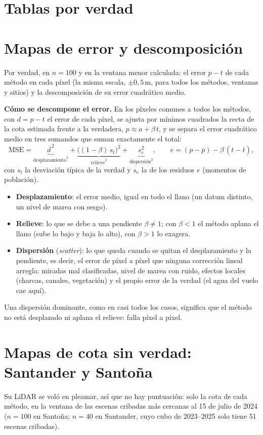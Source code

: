 \documentclass[10pt,a4paper]{article}
\begin{document}
\clearpage
\section*{Tablas por verdad}


\section*{Mapas de error y descomposición}
Por verdad, en $n = 100$ y en la ventana menor calculada: el error $p - t$ de cada método en cada píxel (la misma
escala, $\pm 0{,}5$\,m, para todos los métodos, ventanas y sitios) y la descomposición de su error cuadrático medio.

\textbf{Cómo se descompone el error.} En los píxeles comunes a todos los métodos, con $d = p - t$ el error de cada
píxel, se ajusta por mínimos cuadrados la recta de la cota estimada frente a la verdadera, $p \approx a + \beta\,t$, y
se separa el error cuadrático medio en tres sumandos que suman exactamente el total:
\[
\mathrm{MSE} = \underbrace{\overline{d}^{\,2}}_{\text{desplazamiento}^2}
 + \underbrace{\big((1-\beta)\,s_t\big)^2}_{\text{relieve}^2}
 + \underbrace{s_e^2}_{\text{dispersión}^2},
\qquad e = (p - \overline{p}) - \beta\,(t - \overline{t}),
\]
con $s_t$ la desviación típica de la verdad y $s_e$ la de los residuos $e$ (momentos de población).
\begin{itemize}[leftmargin=1.2em,itemsep=1pt]
\item \textbf{Desplazamiento}: el error medio, igual en todo el llano (un datum distinto, un nivel de marea con sesgo).
\item \textbf{Relieve}: lo que se debe a una pendiente $\beta \ne 1$; con $\beta < 1$ el método aplana el llano
(sube lo bajo y baja lo alto), con $\beta > 1$ lo exagera.
\item \textbf{Dispersión} (\emph{scatter}): lo que queda cuando se quitan el desplazamiento y la pendiente, es decir,
el error de píxel a píxel que ninguna corrección lineal arregla: miradas mal clasificadas, nivel de marea con ruido,
efectos locales (charcas, canales, vegetación) y el propio error de la verdad (el agua del vuelo cae aquí).
\end{itemize}
Una dispersión dominante, como en casi todos los casos, significa que el método no está desplazado ni aplana el
relieve: falla píxel a píxel.



\clearpage
\section*{Mapas de cota sin verdad: Santander y Santoña}
Su LiDAR se voló en pleamar, así que no hay puntuación: solo la cota de cada método, en la ventana de las escenas
cribadas más cercanas al 15 de julio de 2024 ($n = 100$ en Santoña; $n = 40$ en Santander, cuyo cubo de 2023--2025
solo tiene 51 escenas cribadas).
\end{document}
